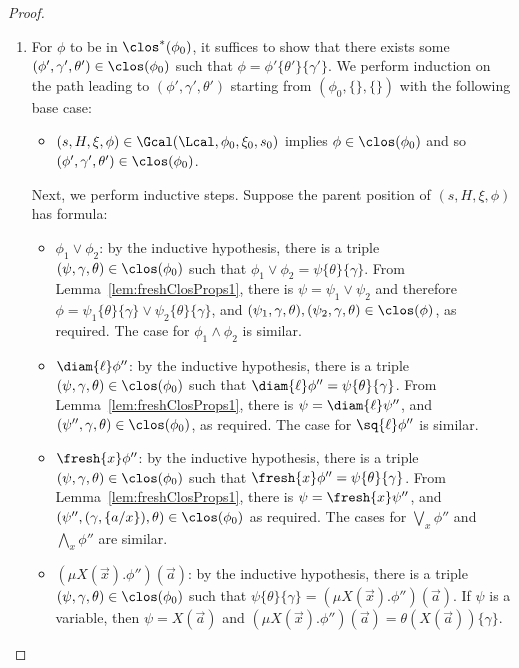 \begin{proof}
	\begin{enumerate}
				\item 
		For $\phi$ to be in $\clos^*(\phi_0)$, it suffices to show that there exists some $(\phi', \gamma', \theta') \in \clos(\phi_0)$ such that $\phi = \phi'\{\theta'\}\{\gamma'\}$. 
		We perform induction on the path leading to $(\phi', \gamma', \theta')$ starting from $(\phi_0, \{\}, \{\})$ with the following base case:
		\begin{itemize}
			\item $(s, H, \xi, \phi) \in \Gcal(\Lcal, \phi_0,\xi_0, s_0)$ implies $\phi \in \clos(\phi_0)$ and so $(\phi', \gamma', \theta') \in \clos(\phi_0)$.
		\end{itemize}
		Next, we perform inductive steps. Suppose the parent position of $(s, H,\xi,\phi)$ has formula:
		\begin{itemize}
			\item $\phi_1 \lor \phi_2$: by the inductive hypothesis, there is a triple $(\psi,\gamma,\theta)\in\clos(\phi_0)$ such that $\phi_1\lor\phi_2=\psi\{\theta\}\{\gamma\}$. From Lemma~\ref{lem:freshClosProps1}, there is $\psi=\psi_1\lor\psi_2$ and therefore $\phi=\psi_1\{\theta\}\{\gamma\}\lor\psi_2\{\theta\}\{\gamma\}$, and $(\psi_1,\gamma,\theta),(\psi_2,\gamma,\theta)\in\clos(\phi)$, as required. The case for  $\phi_1 \land \phi_2$ is similar.
						\item $\diam{\ell}\phi''$: 
			by the inductive hypothesis, there is a triple $(\psi,\gamma, \theta)\in\clos(\phi_0)$ such that $\diam{\ell}\phi''=\psi\{\theta\}\{\gamma\}$.
			From Lemma~\ref{lem:freshClosProps1}, there is $\psi=\diam{\ell}\psi''$, and $(\psi'', \gamma,\theta)\in \clos(\phi_0)$, as required. 
			The case for $\sq{\ell}\phi''$ is similar.
						\item $\fresh{x}\phi''$:
			by the inductive hypothesis, there is a triple $(\psi, \gamma, \theta) \in \clos(\phi_0)$ such that $\fresh{x}\phi''=\psi\{\theta\}\{\gamma\}$.
			From Lemma~\ref{lem:freshClosProps1}, there is $\psi=\fresh{x}\psi''$, and $(\psi'', (\gamma, \{a/x\}), \theta) \in \clos(\phi_0)$ as required.
			The cases for $\bigvee_x \phi''$ and $\bigwedge_x \phi''$ are similar. 
						\item $(\mu X(\vec x).\phi'')(\vec a)$: by the inductive hypothesis, there is a triple $(\psi, \gamma,\theta) \in \clos(\phi_0)$ such that $\psi\{\theta\}\{\gamma\} = (\mu X(\vec x).\phi'')(\vec a)$. 
			If $\psi$ is a variable, then $\psi = X(\vec a)$ and $(\mu X(\vec x).\phi'')(\vec a) = \theta(X(\vec a))\{\gamma\}$. 

\end{itemize}
\end{enumerate}
\end{proof}
